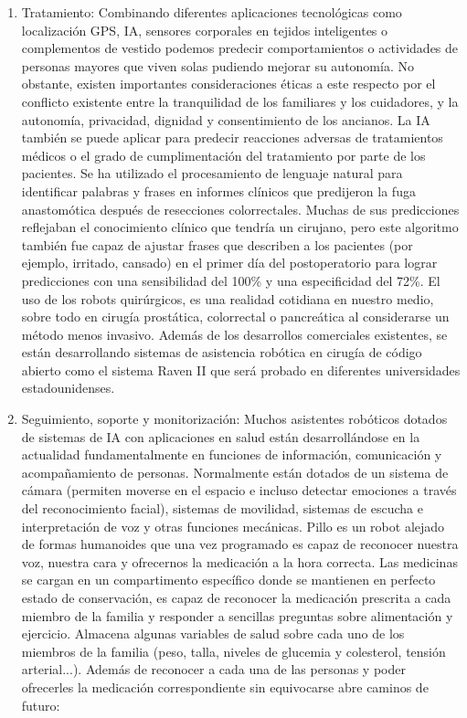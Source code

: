 \documentclass[10pt]{article}
\begin{document}
\begin{enumerate}
    \item Tratamiento: Combinando diferentes aplicaciones tecnológicas como localización GPS, IA, sensores corporales en tejidos inteligentes o complementos de vestido podemos predecir comportamientos o actividades de personas mayores que viven solas pudiendo mejorar su autonomía. No obstante, existen importantes consideraciones éticas a este respecto por el conflicto existente entre la tranquilidad de los familiares y los cuidadores, y la autonomía, privacidad, dignidad y consentimiento de los ancianos. La IA también se puede aplicar para predecir reacciones adversas de tratamientos médicos o el grado de cumplimentación del tratamiento por parte de los pacientes. Se ha utilizado el procesamiento de lenguaje natural para identificar palabras y frases en informes clínicos que predijeron la fuga anastomótica después de resecciones colorrectales. Muchas de sus predicciones reflejaban el conocimiento clínico que tendría un cirujano, pero este algoritmo también fue capaz de ajustar frases que describen a los pacientes (por ejemplo, irritado, cansado) en el primer día del postoperatorio para lograr predicciones con una sensibilidad del 100\% y una especificidad del 72\%. El uso de los robots quirúrgicos, es una realidad cotidiana en nuestro medio, sobre todo en cirugía prostática, colorrectal o pancreática al considerarse un método menos invasivo. Además de los desarrollos comerciales existentes, se están desarrollando sistemas de asistencia robótica en cirugía de código abierto como el sistema Raven II que será probado en diferentes universidades estadounidenses.
    \item Seguimiento, soporte y monitorización: Muchos asistentes robóticos dotados de sistemas de IA con aplicaciones en salud están desarrollándose en la actualidad fundamentalmente en funciones de información, comunicación y acompañamiento de personas. Normalmente están dotados de un sistema de cámara (permiten moverse en el espacio e incluso detectar emociones a través del reconocimiento facial), sistemas de movilidad, sistemas de escucha e interpretación de voz y otras funciones mecánicas. Pillo es un robot alejado de formas humanoides que una vez programado es capaz de reconocer nuestra voz, nuestra cara y ofrecernos la medicación a la hora correcta. Las medicinas se cargan en un compartimento específico donde se mantienen en perfecto estado de conservación, es capaz de reconocer la medicación prescrita a cada miembro de la familia y responder a sencillas preguntas sobre alimentación y ejercicio. Almacena algunas variables de salud sobre cada uno de los miembros de la familia (peso, talla, niveles de glucemia y colesterol, tensión arterial...). Además de reconocer a cada una de las personas y poder ofrecerles la medicación correspondiente sin equivocarse abre caminos de futuro:
    

\end{enumerate}
\end{document}
